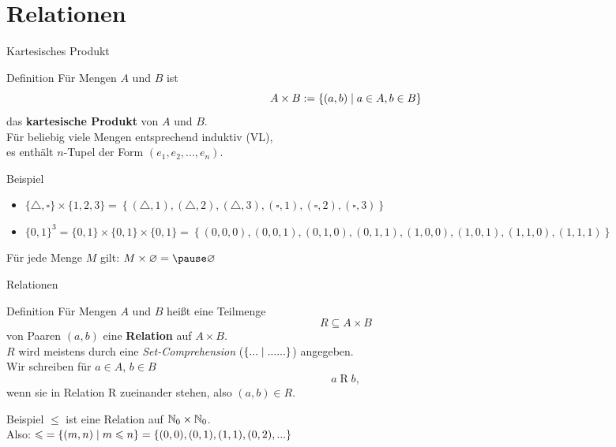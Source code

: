 \section{Relationen}

\begin{frame}{Kartesisches Produkt}
	\begin{block}{Definition}
		Für Mengen $A$ und $B$ ist
		$$A \times B := \left\{ (a,b) \;\middle|\; a \in A, b \in B \right\}$$
		das \textbf{kartesische Produkt} von $A$ und $B$. \\
		\impl Für beliebig viele Mengen entsprechend induktiv (VL), \\
		es enthält $n$-Tupel der Form $(e_1, e_2, ..., e_n)$.
	\end{block}

	\pause
	\begin{block}{Beispiel}
		\begin{itemize}
			\item $\{\triangle,\square\} \times \{1, 2, 3\} = \left\{(\triangle, 1), (\triangle, 2), (\triangle, 3), (\square, 1), (\square, 2), (\square, 3)\right\}$ 
			\item 	$\{0, 1\}^3 = \{0,1\} \times \{0,1\} \times \{0,1\} = \left\{(0, 0, 0), (0, 0, 1), (0, 1, 0), (0, 1, 1), (1, 0, 0), (1, 0, 1), (1, 1, 0), (1, 1, 1)\right\} $
		\end{itemize}
		
	 
	   Für jede Menge $M$ gilt: $ M \times \emptyset = \pause \emptyset $
	\end{block}
\end{frame}

\begin{frame}{Relationen}
	\begin{block}{Definition}
		Für Mengen $A$ und $B$ heißt eine Teilmenge 
		$$R \subseteq A \times B$$
		von Paaren $(a,b)$ eine \textbf{Relation} auf $A \times B$. \\
		\smallskip
		$R$ wird meistens durch eine \emph{Set-Comprehension} ($\left\{... \vphantom{(} \;\middle|\; ......\right\}$) angegeben. \\
		\smallskip
		Wir schreiben für $a \in A$, $b \in B$ 
		$$a \mathrel{R} b, $$
		wenn sie in Relation R zueinander stehen, also $(a, b) \in R$.
	\end{block}
	
	\pause
	\begin{block}{Beispiel} 
		$\leq$ ist eine Relation auf $\mathbb{N}_0 \times \mathbb{N}_0 $. \\
		Also: $ \text{$\leqslant$} = \left\{(m, n) \;\middle|\; m \leqslant n \right\} = \{(0, 0), (0, 1), (1, 1), (0, 2), ...\} $
	\end{block}
\end{frame}


